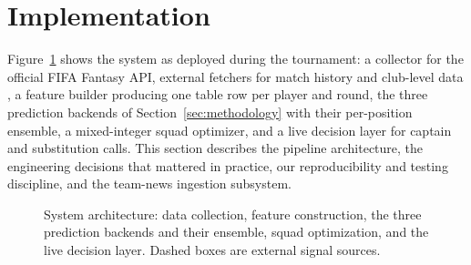 \section{Implementation}
\label{sec:implementation}

Figure~\ref{fig:architecture} shows the system as deployed during the
tournament: a collector for the official FIFA Fantasy API, external
fetchers for match history \citep{martj42} and club-level data
\citep{footballdata}, a feature builder producing one table row per
player and round, the three prediction backends of
Section~\ref{sec:methodology} with their per-position ensemble, a
mixed-integer squad optimizer, and a live decision layer for captain
and substitution calls. This section describes the pipeline
architecture, the engineering decisions that mattered in practice,
our reproducibility and testing discipline, and the team-news
ingestion subsystem.

\begin{figure}[t]
  \centering
  \caption{System architecture: data collection, feature construction,
    the three prediction backends and their ensemble, squad
    optimization, and the live decision layer. Dashed boxes are
    external signal sources.}
  \label{fig:architecture}
\end{figure}

